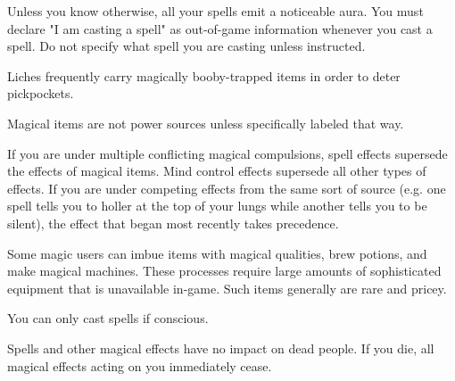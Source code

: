 \documentclass[green]{Sel}
\begin{document}
\name{\gMagic{}}
Unless you know otherwise, all your spells emit a noticeable aura. You must declare "I am casting a spell" as out-of-game information whenever you cast a spell. Do not specify what spell you are casting unless instructed.

Liches frequently carry magically booby-trapped items in order to deter pickpockets.

Magical items are not power sources unless specifically labeled that way.

If you are under multiple conflicting magical compulsions, spell effects supersede the effects of magical items. Mind control effects supersede all other types of effects. If you are under competing effects from the same sort of source (e.g. one spell tells you to holler at the top of your lungs while another tells you to be silent), the effect that began most recently takes precedence.

Some magic users can imbue items with magical qualities, brew potions, and make magical machines. These processes require large amounts of sophisticated equipment that is unavailable in-game. Such items generally are rare and pricey.

You can only cast spells if conscious.

Spells and other magical effects have no impact on dead people. If you die, all magical effects acting on you immediately cease.
\end{document}
